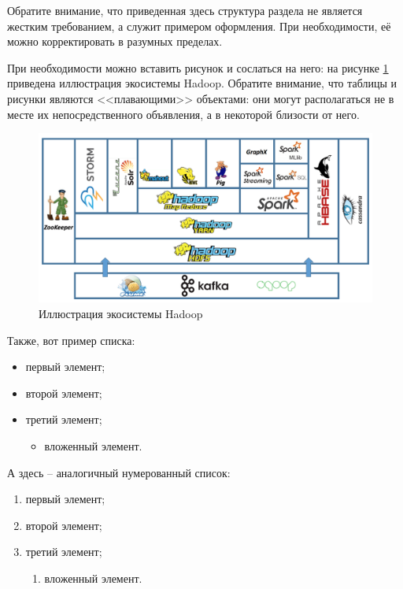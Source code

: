 Обратите внимание, что приведенная здесь структура раздела не является жестким требованием, а служит примером оформления. При необходимости, её можно корректировать в разумных пределах.

При необходимости можно вставить рисунок и сослаться на него: на рисунке \ref{fig:HadoopEcoSystem} приведена иллюстрация экосистемы Hadoop. Обратите внимание, что таблицы и рисунки являются <<плавающими>> объектами: они могут располагаться не в месте их непосредственного объявления, а в некоторой близости от него.

\begin{figure}
    \centering
    \includegraphics[width=\textwidth]{Content/Images/HadoopEcoSystem.png}
    \caption{Иллюстрация экосистемы Hadoop}
    \label{fig:HadoopEcoSystem}
\end{figure}

Также, вот пример списка:

\begin{itemize}
    \item первый элемент;
    \item второй элемент;
    \item третий элемент;
    \begin{itemize}
        \item вложенный элемент.
    \end{itemize}
\end{itemize}

А здесь -- аналогичный нумерованный список:

\begin{enumerate}
    \item первый элемент;
    \item второй элемент;
    \item третий элемент;
    \begin{enumerate}
        \item вложенный элемент.
    \end{enumerate}
\end{enumerate}

